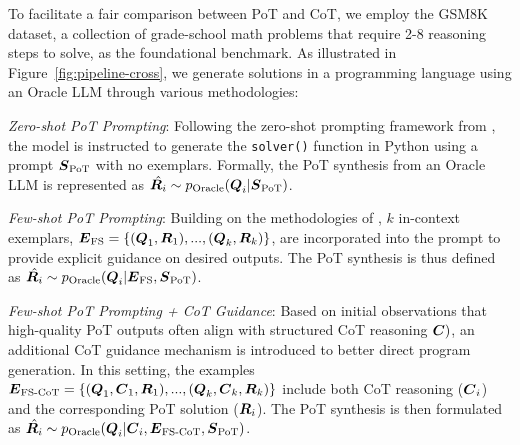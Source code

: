 To facilitate a fair comparison between PoT and CoT, we employ the GSM8K dataset, a collection of grade-school math problems that require 2-8 reasoning steps to solve, as the foundational benchmark.
%
As illustrated in Figure~\ref{fig:pipeline-cross}, we generate solutions in a programming language using an Oracle LLM through various methodologies:
\begin{compactenum}[1.]
    \item \textit{Zero-shot PoT Prompting}: Following the zero-shot prompting framework from \citet{pot}, the model is instructed to generate the \texttt{solver()} function in Python using a prompt $\vb*{S}_\text{PoT}$ with no exemplars. 
    Formally, the PoT synthesis from an Oracle LLM is represented as $\hat{\vb*{R}_i}\sim p_\text{Oracle}(\vb*{Q}_i|\vb*{S}_\text{PoT})$.
    
    \item \textit{Few-shot PoT Prompting}: Building on the methodologies of \citet{pot, pal}, $k$ in-context exemplars, $\vb*{E}_\text{FS}=\{(\vb*{Q}_1, \vb*{R}_1), ...,  (\vb*{Q}_k, \vb*{R}_k)\}$, are incorporated into the prompt to provide explicit guidance on desired outputs. 
    The PoT synthesis is thus defined as $\hat{\vb*{R}_i}\sim p_\text{Oracle}(\vb*{Q}_i|\vb*{E}_\text{FS},\vb*{S}_\text{PoT})$.
    
    \item \textit{Few-shot PoT Prompting + CoT Guidance}: Based on initial observations that high-quality PoT outputs often align with structured CoT reasoning $\vb*{C})$, an additional CoT guidance mechanism is introduced to better direct program generation. 
    In this setting, the examples $\vb*{E}_\text{FS-CoT}=\{(\vb*{Q}_1, \vb*{C}_1, \vb*{R}_1), ...,  (\vb*{Q}_k, \vb*{C}_k, \vb*{R}_k)\}$ include both CoT reasoning ($\vb*{C}_i$) and the corresponding PoT solution ($\vb*{R}_i$). 
    The PoT synthesis is then formulated as $\hat{\vb*{R}_i}\sim p_\text{Oracle}(\vb*{Q}_i|\vb*{C}_i, \vb*{E}_\text{FS-CoT},\vb*{S}_\text{PoT})$.
\end{compactenum}


